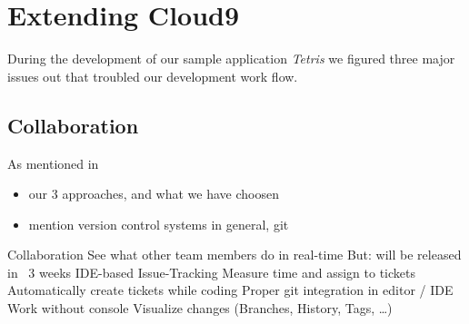 \section{Extending Cloud9}
\label{sec:Approaches}
During the development of our sample application \emph{Tetris} we figured three major issues out that troubled our development work flow.

\subsection{Collaboration}
As mentioned in  

\begin{itemize}
	\item our 3 approaches, and what we have choosen
	\item mention version control systems in general, git
\end{itemize}


Collaboration
	See what other team members do in real-time
	But: will be released in ~3 weeks
IDE-based Issue-Tracking
	Measure time and assign to tickets
	Automatically create tickets while coding
Proper git integration in editor / IDE
	Work without console
	Visualize changes
	(Branches, History, Tags, …)

